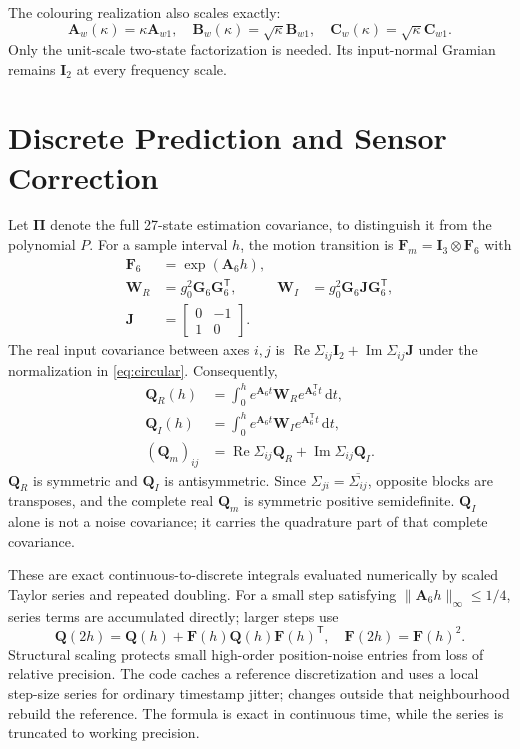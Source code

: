 \documentclass[conference]{IEEEtran}
\newcommand{\mt}[1]{\bm{#1}}
\newcommand{\tr}{^{\mathsf T}}
\newcommand{\dd}{\mathrm d}
\DeclareMathOperator{\Rea}{Re}
\DeclareMathOperator{\Ima}{Im}
\begin{document}
The colouring realization also scales exactly:
\begin{equation}
 \mt A_w(\kappa)=\kappa\mt A_{w1},\quad
 \mt B_w(\kappa)=\sqrt\kappa\mt B_{w1},\quad
 \mt C_w(\kappa)=\sqrt\kappa\mt C_{w1}.
 \label{eq:colourscale}
\end{equation}
Only the unit-scale two-state factorization is needed. Its input-normal
Gramian remains $\mt I_2$ at every frequency scale.

\section{Discrete Prediction and Sensor Correction}
\label{sec:kalman}
Let $\mt\Pi$ denote the full 27-state estimation covariance, to distinguish
it from the polynomial $P$. For a sample interval $h$, the motion
transition is $\mt F_m=\mt I_3\otimes\mt F_6$ with
\begin{align}
 \mt F_6&=\exp(\mt A_6h),\nonumber\\
 \mt W_R&=g_0^2\mt G_6\mt G_6\tr,&
 \mt W_I&=g_0^2\mt G_6\mt J\mt G_6\tr,\label{eq:WRWI}\\
 \mt J&=\begin{bmatrix}0&-1\\1&0\end{bmatrix}.\nonumber
\end{align}
The real input covariance between axes $i,j$ is
$\Rea\Sigma_{ij}\mt I_2+\Ima\Sigma_{ij}\mt J$ under the normalization
in \cref{eq:circular}. Consequently,
\begin{align}
 \mt Q_R(h)&=\int_0^h e^{\mt A_6t}\mt W_R e^{\mt A_6\tr t}\,\dd t,\nonumber\\
 \mt Q_I(h)&=\int_0^h e^{\mt A_6t}\mt W_I e^{\mt A_6\tr t}\,\dd t,\label{eq:Qpair}\\
 (\mt Q_m)_{ij}&=\Rea\Sigma_{ij}\mt Q_R+
                  \Ima\Sigma_{ij}\mt Q_I.\nonumber
\end{align}
$\mt Q_R$ is symmetric and $\mt Q_I$ is antisymmetric. Since
$\Sigma_{ji}=\overline{\Sigma_{ij}}$, opposite blocks are transposes,
and the complete real $\mt Q_m$ is symmetric positive semidefinite.
$\mt Q_I$ alone is not a noise covariance; it carries the quadrature
part of that complete covariance.

These are exact continuous-to-discrete integrals \cite{vanloan} evaluated
numerically by scaled Taylor series and repeated doubling. For a small
step satisfying $\|\mt A_6h\|_\infty\le1/4$, series terms are accumulated
directly; larger steps use
\begin{equation}
 \mt Q(2h)=\mt Q(h)+\mt F(h)\mt Q(h)\mt F(h)\tr,\quad
 \mt F(2h)=\mt F(h)^2.
 \label{eq:doubling}
\end{equation}
Structural scaling protects small high-order position-noise entries from
loss of relative precision. The code caches a reference discretization and
uses a local step-size series for ordinary timestamp jitter; changes
outside that neighbourhood rebuild the reference. The formula is exact
in continuous time, while the series is truncated to working precision.
\end{document}
